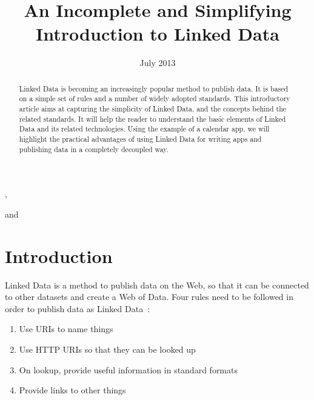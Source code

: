 \documentclass{IOS-Book-Article}
\begin{document}
\thispagestyle{empty}
\pagestyle{headings}
\setcounter{page}{21}

\begin{frontmatter}                           %

\title{An Incomplete and Simplifying Introduction to Linked Data}
\author[A]{ },
\author[C]{ } and
\author[B]{ }

\address[A]{Hasso-Plattner-Institut, Potsdam, Germany;\\ E-mail: Anja.Jentzsch@hpi.uni-potsdam.de}
\address[B]{Wikimedia Deuschland, Germany;}
\address[C]{Agile Knowledge Engineering and Semantic Web (AKSW), Leipzig University, Leipzig, Germany; E-mail: ricardo.usbeck@informatik.uni-leipzig.de}

\date{July 2013}

\maketitle

\begin{abstract}
Linked Data is becoming an increasingly popular method to publish data.
It is based on a simple set of rules and a number of widely adopted standards.
This introductory article aims at capturing the simplicity of Linked Data, and the concepts behind the related standards.
It will help the reader to understand the basic elements of Linked Data and its related technologies.
Using the example of a calendar app, we will highlight the practical advantages of using Linked Data for writing apps and publishing data in a completely decoupled way.
\end{abstract}

\end{frontmatter}

\section{Introduction}
\label{intro}
Linked Data is a method to publish data on the Web, so that it can be connected to other datasets and create a Web of Data.
Four rules need to be followed in order to publish data as Linked Data~\cite{linkeddata-rules}:

\begin{enumerate}
\item Use URIs to name things
\item Use HTTP URIs so that they can be looked up
\item On lookup, provide useful information in standard formats
\item Provide links to other things
\end{enumerate}
\end{document}
